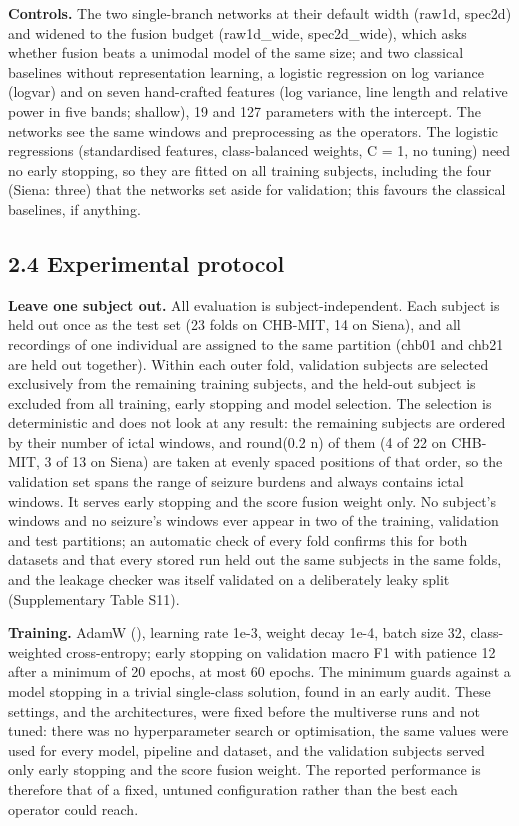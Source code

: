 \documentclass[11pt,a4paper]{article}
\begin{document}
\textbf{Controls.} The two single-branch networks at their default width (raw1d, spec2d)
and widened to the fusion budget (raw1d\_wide, spec2d\_wide), which asks whether fusion
beats a unimodal model of the same size; and two classical baselines without
representation learning, a logistic regression on log variance (logvar) and on seven
hand-crafted features (log variance, line length and relative power in five bands;
shallow), 19 and 127 parameters with the intercept. The networks see the same windows
and preprocessing as the operators. The logistic regressions (standardised features,
class-balanced weights, C = 1, no tuning) need no early stopping, so they are fitted
on all training subjects, including the four (Siena: three) that the networks set aside
for validation; this favours the classical baselines, if anything.

\subsection{2.4 Experimental protocol}\label{experimental-protocol}

\textbf{Leave one subject out.} All evaluation is subject-independent. Each subject is held
out once as the test set (23 folds on CHB-MIT, 14 on Siena), and all recordings of one
individual are assigned to the same partition (chb01 and chb21 are held out together).
Within each outer fold, validation subjects are selected exclusively from the remaining
training subjects, and the held-out subject is excluded from all training, early
stopping and model selection. The selection is deterministic and does not look at
any result: the remaining subjects are ordered by their number of ictal windows, and
round(0.2 n) of them (4 of 22 on CHB-MIT, 3 of 13 on Siena) are taken at evenly spaced
positions of that order, so the validation set spans the range of seizure burdens and
always contains ictal windows. It serves early stopping and the score fusion weight
only. No subject's windows and no seizure's windows ever appear in two of the
training, validation and test partitions; an automatic check of every fold confirms
this for both datasets and that every stored run held out the same subjects in the
same folds, and the leakage checker was itself validated on a deliberately leaky split
(Supplementary Table S11).

\textbf{Training.} AdamW (\citealp{Loshchilov_2019}), learning rate 1e-3, weight decay
1e-4, batch size 32, class-weighted cross-entropy; early stopping on validation macro
F1 with patience 12 after a minimum of 20 epochs, at most 60 epochs. The minimum guards
against a model stopping in a trivial single-class solution, found in an early audit.
These settings, and the architectures, were fixed before the multiverse runs and not
tuned: there was no hyperparameter search or optimisation, the same values were used
for every model, pipeline and dataset, and the validation subjects served only early
stopping and the score fusion weight. The reported performance is therefore that of a
fixed, untuned configuration rather than the best each operator could reach.
\end{document}
